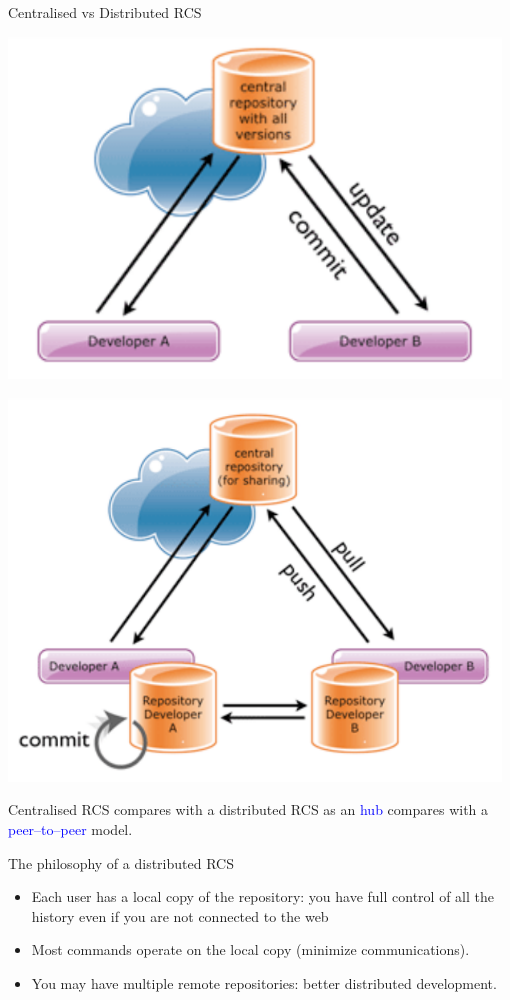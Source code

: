 \documentclass{beamer}
\begin{document}
\begin{frame}{Centralised vs Distributed RCS}
\begin{minipage}{0.45\textwidth}
\includegraphics[width=0.98\textwidth]{figures/centralised}
\end{minipage}
\hfill
\begin{minipage}{0.45\textwidth}
\includegraphics[width=0.98\textwidth]{figures/distributed}
\end{minipage}
\medskip

Centralised RCS compares with a distributed RCS as an \textcolor{blue}{hub} compares with a \textcolor{blue}{peer--to--peer} model.
\end{frame}
\begin{frame}{The philosophy of a distributed RCS}
\begin{itemize}
\item Each user has a local copy of the repository: you have full control of all the history even if you are not connected to the web
\item Most commands operate on the local copy (minimize communications).
\item You may have multiple remote repositories: better distributed development.
\end{itemize}
\end{frame}
\end{document}
